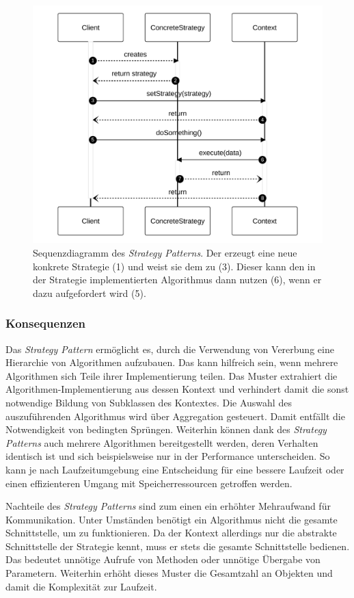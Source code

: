 \begin{figure}[!ht]
	\centering
	\includegraphics[width=0.75\linewidth]{images/patterns/strategy-seq.pdf}
	\caption{Sequenzdiagramm des \emph{Strategy Patterns}. Der  erzeugt eine neue konkrete Strategie (1) und weist sie dem  zu (3). Dieser kann den in der Strategie implementierten Algorithmus dann nutzen (6), wenn er dazu aufgefordert wird (5). \cite{skobeleva_strategy_2023}}
	\label{fig:strategy-seq}
\end{figure}

\subsubsection*{Konsequenzen}
Das \emph{Strategy Pattern} ermöglicht es, durch die Verwendung von Vererbung eine Hierarchie von Algorithmen aufzubauen. Das kann hilfreich sein, wenn mehrere Algorithmen sich Teile ihrer Implementierung teilen. Das Muster extrahiert die Algorithmen-Implementierung aus dessen Kontext und verhindert damit die sonst notwendige Bildung von Subklassen des Kontextes. Die Auswahl des auszuführenden Algorithmus wird über Aggregation gesteuert. Damit entfällt die Notwendigkeit von bedingten Sprüngen. Weiterhin können dank des \emph{Strategy Patterns} auch mehrere Algorithmen bereitgestellt werden, deren Verhalten identisch ist und sich beispielsweise nur in der Performance unterscheiden. So kann je nach Laufzeitumgebung eine Entscheidung für eine bessere Laufzeit oder einen effizienteren Umgang mit Speicherressourcen getroffen werden.

Nachteile des \emph{Strategy Patterns} sind zum einen ein erhöhter Mehraufwand für Kommunikation. Unter Umständen benötigt ein Algorithmus nicht die gesamte Schnittstelle, um zu funktionieren. Da der Kontext allerdings nur die abstrakte Schnittstelle der Strategie kennt, muss er stets die gesamte Schnittstelle bedienen. Das bedeutet unnötige Aufrufe von Methoden oder unnötige Übergabe von Parametern. Weiterhin erhöht dieses Muster die Gesamtzahl an Objekten und damit die Komplexität zur Laufzeit. \cite{gamma_design_1995}